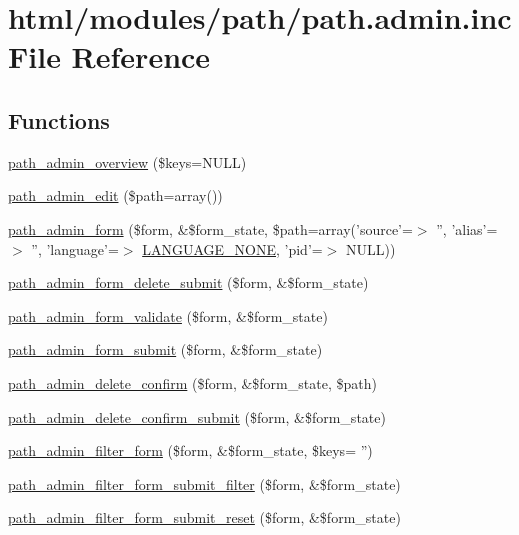 \hypertarget{path_8admin_8inc}{
\section{html/modules/path/path.admin.inc File Reference}
\label{path_8admin_8inc}
}
\subsection*{Functions}
\begin{DoxyCompactItemize}
\item 
\hyperlink{path_8admin_8inc_a08b0593e253b2d3813fc7fb9514b9142}{path\_\-admin\_\-overview} (\$keys=NULL)
\item 
\hyperlink{path_8admin_8inc_aa1b0bbde16c010de5f5e617ff83eb14d}{path\_\-admin\_\-edit} (\$path=array())
\item 
\hyperlink{group__forms_ga712dc47396e1cfb8f1872920973db244}{path\_\-admin\_\-form} (\$form, \&\$form\_\-state, \$path=array('source'=$>$ '', 'alias'=$>$ '', 'language'=$>$ \hyperlink{bootstrap_8inc_a9e91e2136aa0ce5c5e80f06aa3ad8266}{LANGUAGE\_\-NONE}, 'pid'=$>$ NULL))
\item 
\hyperlink{path_8admin_8inc_af54710cda76e928325030bf33414b8d3}{path\_\-admin\_\-form\_\-delete\_\-submit} (\$form, \&\$form\_\-state)
\item 
\hyperlink{path_8admin_8inc_a4251683f0b26edf9f54db68f4aa5e0b3}{path\_\-admin\_\-form\_\-validate} (\$form, \&\$form\_\-state)
\item 
\hyperlink{path_8admin_8inc_a9e4a6b6f202fad04dcdb2bbcd800d168}{path\_\-admin\_\-form\_\-submit} (\$form, \&\$form\_\-state)
\item 
\hyperlink{path_8admin_8inc_adb99300f9234551a6cbe35475e71d55d}{path\_\-admin\_\-delete\_\-confirm} (\$form, \&\$form\_\-state, \$path)
\item 
\hyperlink{path_8admin_8inc_a11e17265eec5e2e31acf2c251f270e78}{path\_\-admin\_\-delete\_\-confirm\_\-submit} (\$form, \&\$form\_\-state)
\item 
\hyperlink{group__forms_ga2ef41a9ef077b1b4c0fbfa2971c155d1}{path\_\-admin\_\-filter\_\-form} (\$form, \&\$form\_\-state, \$keys= '')
\item 
\hyperlink{path_8admin_8inc_a250d1de05853ce7562fb1b9530dba273}{path\_\-admin\_\-filter\_\-form\_\-submit\_\-filter} (\$form, \&\$form\_\-state)
\item 
\hyperlink{path_8admin_8inc_a89dc681fab5e84263049933d97823291}{path\_\-admin\_\-filter\_\-form\_\-submit\_\-reset} (\$form, \&\$form\_\-state)
\end{DoxyCompactItemize}


